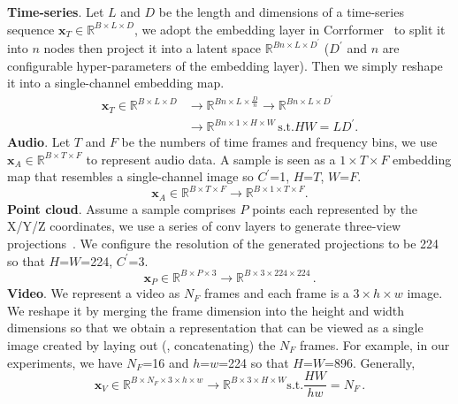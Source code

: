 \documentclass[10pt,twocolumn,letterpaper]{article}
\begin{document}
    \noindent\textbf{Time-series}. Let $L$ and $D$ be the length and dimensions of a time-series sequence $\boldsymbol{x}_T\in \mathbb{R}^{B\times L \times D}$, we adopt the embedding layer in Corrformer~\cite{wu2023interpretable} to split it into $n$ nodes then project it into a latent space $\mathbb{R}^{Bn \times L \times D^\prime}$ ($D^\prime$ and $n$ are configurable hyper-parameters of the embedding layer). Then we simply reshape it into a single-channel embedding map.
    \begin{equation}\label{eq:time:token}
        \begin{aligned}
             \boldsymbol{x}_T \in\mathbb{R}^{B\times L \times D } & \rightarrow \mathbb{R}^{Bn \times L \times \frac{D}{n}} \rightarrow \mathbb{R}^{Bn \times L \times D^\prime} \\ &\rightarrow \mathbb{R}^{Bn\times 1 \times H \times W }\, \text{s.t.} HW=LD^\prime.
        \end{aligned}
    \end{equation}
\textbf{Audio}. Let $T$ and $F$ be the numbers of time frames and frequency bins, we use $\boldsymbol{x}_A \in \mathbb{R}^{B\times T\times F}$ to represent audio data. A sample is seen as a $1\times T\times F$ embedding map that resembles a single-channel image so $C^\prime$=1, $H$=$T$, $W$=$F$.
	\begin{equation}
		\boldsymbol{x}_A \in \mathbb{R}^{B\times T \times F} \rightarrow \mathbb{R}^{B\times 1 \times T \times F}.
		\label{eq:audio:token}
	\end{equation}
\textbf{Point cloud}. Assume a sample comprises \(P\) points each represented by the X/Y/Z coordinates, we use a series of conv layers to generate three-view projections~\cite{zhang2023meta}. We configure the resolution of the generated projections to be 224 so that $H$=$W$=224, $C^\prime$=3.
 	\begin{equation}
		\boldsymbol{x}_P \in \mathbb{R}^{B\times P \times 3} \rightarrow  \mathbb{R}^{B\times 3 \times 224 \times 224 }\,.
		\label{eq:pcd:token}
	\end{equation}
\textbf{Video}. We represent a video as $N_F$ frames and each frame is a $3\times h \times w$ image. We reshape it by merging the frame dimension into the height and width dimensions so that we obtain a representation that can be viewed as a single image created by laying out (\ie, concatenating) the $N_F$ frames. For example, in our experiments, we have $N_F$=16 and $h$=$w$=224 so that $H$=$W$=896. Generally,
    \begin{equation}
        \label{eq:video:token}
        \boldsymbol{x}_V\in\mathbb{R}^{B\times N_F\times3\times h \times w}\rightarrow \mathbb{R}^{B\times 3\times H\times W}\text{s.t.}\frac{HW}{hw}=N_F\,.
    \end{equation}
\end{document}
